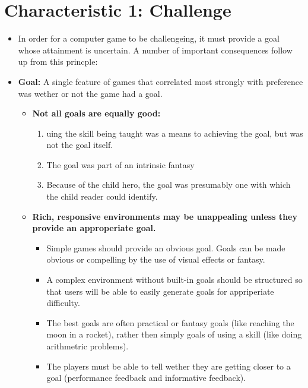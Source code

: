   \section*{Characteristic 1: Challenge}
    \begin{itemize}
      \item In order for a computer game to be challengeing, it must provide a goal whose attainment is uncertain. A number of important consequences follow up from this princple:
      \item {\bf Goal:} A single feature of games that correlated most strongly with preference was wether or not the game had a goal.
        \begin{itemize}
          \item {\bf Not all goals are equally good:}
            \begin{enumerate}
              \item uing the skill being taught was a means to achieving the goal, but was not the goal itself.
              \item The goal was part of an intrinsic fantasy
              \item Because of the child hero, the goal was presumably one with which the child reader could identify.
            \end{enumerate}
          \item {\bf Rich, responsive environments may be unappealing unless they provide an approperiate goal.}
            \begin{itemize}
              \item Simple games should provide an obvious goal. Goals can be made obvious or compelling by the use of visual effects or fantasy.
              \item A complex environment without built-in goals should be structured so that users will be able to easily generate goals for appriperiate difficulty. 
              \item The best goals are often practical or fantasy goals (like reaching the moon in a rocket), rather then simply goals of using a skill (like doing arithmetric problems).
              \item The players must be able to tell wether they are getting closer to a goal (performance feedback and informative feedback).
            \end{itemize}
        \end{itemize}


\end{itemize}
